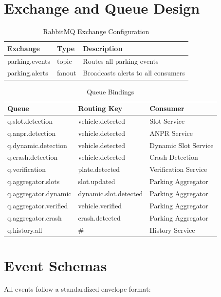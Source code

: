 \documentclass[12pt,a4paper]{report}
\begin{document}
\section{Exchange and Queue Design}

\begin{table}[H]
\centering
\caption{RabbitMQ Exchange Configuration}
\begin{tabular}{|l|l|l|}
\hline
\textbf{Exchange} & \textbf{Type} & \textbf{Description} \\
\hline
parking.events & topic & Routes all parking events \\
\hline
parking.alerts & fanout & Broadcasts alerts to all consumers \\
\hline
\end{tabular}
\end{table}

\begin{table}[H]
\centering
\caption{Queue Bindings}
\begin{tabular}{|l|l|l|}
\hline
\textbf{Queue} & \textbf{Routing Key} & \textbf{Consumer} \\
\hline
q.slot.detection & vehicle.detected & Slot Service \\
\hline
q.anpr.detection & vehicle.detected & ANPR Service \\
\hline
q.dynamic.detection & vehicle.detected & Dynamic Slot Service \\
\hline
q.crash.detection & vehicle.detected & Crash Detection \\
\hline
q.verification & plate.detected & Verification Service \\
\hline
q.aggregator.slots & slot.updated & Parking Aggregator \\
\hline
q.aggregator.dynamic & dynamic.slot.detected & Parking Aggregator \\
\hline
q.aggregator.verified & vehicle.verified & Parking Aggregator \\
\hline
q.aggregator.crash & crash.detected & Parking Aggregator \\
\hline
q.history.all & \#  & History Service \\
\hline
\end{tabular}
\end{table}

\section{Event Schemas}

All events follow a standardized envelope format:
\end{document}
